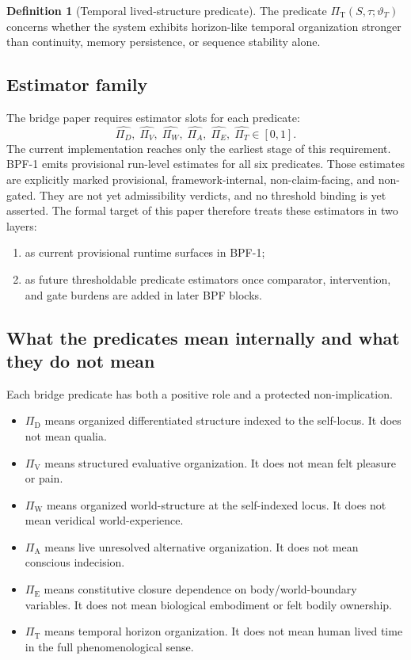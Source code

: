 \documentclass[11pt,a4paper]{article}
\theoremstyle{definition}
\newtheorem{definition}[theorem]{Definition}
\newcommand{\PiD}{\Pi_{\mathrm{D}}}
\newcommand{\PiV}{\Pi_{\mathrm{V}}}
\newcommand{\PiW}{\Pi_{\mathrm{W}}}
\newcommand{\PiA}{\Pi_{\mathrm{A}}}
\newcommand{\PiE}{\Pi_{\mathrm{E}}}
\newcommand{\PiT}{\Pi_{\mathrm{T}}}
\begin{document}
\begin{definition}[Temporal lived-structure predicate]
The predicate $\PiT(S,\tau;\vartheta_T)$ concerns whether the system exhibits horizon-like temporal organization stronger than continuity, memory persistence, or sequence stability alone.
\end{definition}

\subsection{Estimator family}
The bridge paper requires estimator slots for each predicate:
\[
\widehat{\Pi_D},\;\widehat{\Pi_V},\;\widehat{\Pi_W},\;\widehat{\Pi_A},\;\widehat{\Pi_E},\;\widehat{\Pi_T}\in [0,1].
\]
The current implementation reaches only the earliest stage of this requirement. BPF-1 emits provisional run-level estimates for all six predicates. Those estimates are explicitly marked provisional, framework-internal, non-claim-facing, and non-gated. They are not yet admissibility verdicts, and no threshold binding is yet asserted. The formal target of this paper therefore treats these estimators in two layers:
\begin{enumerate}[leftmargin=1.5em]
\item as current provisional runtime surfaces in BPF-1;
\item as future thresholdable predicate estimators once comparator, intervention, and gate burdens are added in later BPF blocks.
\end{enumerate}

\subsection{What the predicates mean internally and what they do not mean}
Each bridge predicate has both a positive role and a protected non-implication.
\begin{itemize}[leftmargin=1.5em]
\item $\PiD$ means organized differentiated structure indexed to the self-locus. It does not mean qualia.
\item $\PiV$ means structured evaluative organization. It does not mean felt pleasure or pain.
\item $\PiW$ means organized world-structure at the self-indexed locus. It does not mean veridical world-experience.
\item $\PiA$ means live unresolved alternative organization. It does not mean conscious indecision.
\item $\PiE$ means constitutive closure dependence on body/world-boundary variables. It does not mean biological embodiment or felt bodily ownership.
\item $\PiT$ means temporal horizon organization. It does not mean human lived time in the full phenomenological sense.
\end{itemize}
\end{document}
